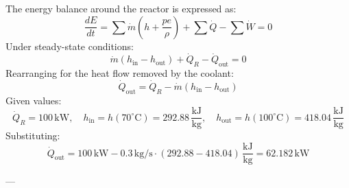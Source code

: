 The energy balance around the reactor is expressed as:  
\[
\frac{dE}{dt} = \sum \dot{m} (h + \frac{pe}{\rho}) + \sum \dot{Q} - \sum \dot{W} = 0
\]  
Under steady-state conditions:  
\[
\dot{m} (h_{\text{in}} - h_{\text{out}}) + \dot{Q}_R - \dot{Q}_{\text{out}} = 0
\]  
Rearranging for the heat flow removed by the coolant:  
\[
\dot{Q}_{\text{out}} = \dot{Q}_R - \dot{m} (h_{\text{in}} - h_{\text{out}})
\]  
Given values:  
\[
\dot{Q}_R = 100 \, \text{kW}, \quad h_{\text{in}} = h(70^\circ\text{C}) = 292.88 \, \frac{\text{kJ}}{\text{kg}}, \quad h_{\text{out}} = h(100^\circ\text{C}) = 418.04 \, \frac{\text{kJ}}{\text{kg}}
\]  
Substituting:  
\[
\dot{Q}_{\text{out}} = 100 \, \text{kW} - 0.3 \, \text{kg/s} \cdot (292.88 - 418.04) \, \frac{\text{kJ}}{\text{kg}} = 62.182 \, \text{kW}
\]  

---